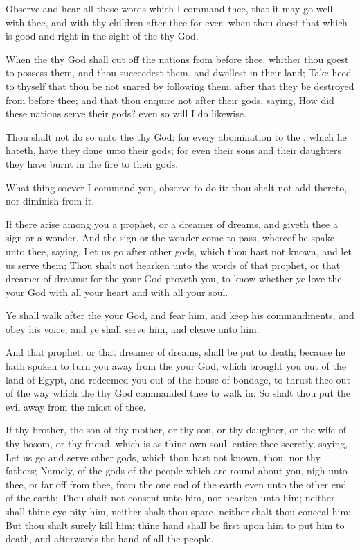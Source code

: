 \Verse Observe and hear all these words which I command thee, that it may go well with thee, and with thy children after thee for ever, when thou doest that which is good and right in the sight of the \LORD thy God.

\Verse When the \LORD thy God shall cut off the nations from before thee, whither thou goest to possess them, and thou succeedest them, and dwellest in their land; \Verse Take heed to thyself that thou be not snared by following them, after that they be destroyed from before thee; and that thou enquire not after their gods, saying, How did these nations serve their gods? even so will I do likewise.

\Verse Thou shalt not do so unto the \LORD thy God: for every abomination to the \LORD, which he hateth, have they done unto their gods; for even their sons and their daughters they have burnt in the fire to their gods.

\Verse What thing soever I command you, observe to do it: thou shalt not add thereto, nor diminish from it.


\Chapter
\Verse If there arise among you a prophet, or a dreamer of dreams, and giveth thee a sign or a wonder, \Verse And the sign or the wonder come to pass, whereof he spake unto thee, saying, Let us go after other gods, which thou hast not known, and let us serve them; \Verse Thou shalt not hearken unto the words of that prophet, or that dreamer of dreams: for the \LORD your God proveth you, to know whether ye love the \LORD your God with all your heart and with all your soul.

\Verse Ye shall walk after the \LORD your God, and fear him, and keep his commandments, and obey his voice, and ye shall serve him, and cleave unto him.

\Verse And that prophet, or that dreamer of dreams, shall be put to death; because he hath spoken to turn you away from the \LORD your God, which brought you out of the land of Egypt, and redeemed you out of the house of bondage, to thrust thee out of the way which the \LORD thy God commanded thee to walk in. So shalt thou put the evil away from the midst of thee.

\Verse If thy brother, the son of thy mother, or thy son, or thy daughter, or the wife of thy bosom, or thy friend, which is as thine own soul, entice thee secretly, saying, Let us go and serve other gods, which thou hast not known, thou, nor thy fathers; \Verse Namely, of the gods of the people which are round about you, nigh unto thee, or far off from thee, from the one end of the earth even unto the other end of the earth; \Verse Thou shalt not consent unto him, nor hearken unto him; neither shall thine eye pity him, neither shalt thou spare, neither shalt thou conceal him: \Verse But thou shalt surely kill him; thine hand shall be first upon him to put him to death, and afterwards the hand of all the people.


